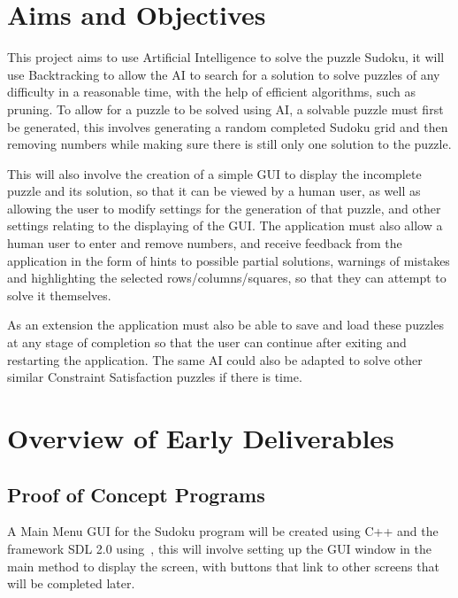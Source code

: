 \documentclass[]{final_report}
\begin{document}
\section*{Aims and Objectives}

This project aims to use Artificial Intelligence to solve the puzzle Sudoku, it will use Backtracking to allow the AI to search for a solution to solve puzzles of any difficulty in a reasonable time, with the help of efficient algorithms, such as pruning. To allow for a puzzle to be solved using AI, a solvable puzzle must first be generated, this involves generating a random completed Sudoku grid and then removing numbers while making sure there is still only one solution to the puzzle.

This will also involve the creation of a simple GUI to display the incomplete puzzle and its solution, so that it can be viewed by a human user, as well as allowing the user to modify settings for the generation of that puzzle, and other settings relating to the displaying of the GUI. The application must also allow a human user to enter and remove numbers, and receive feedback from the application in the form of hints to possible partial solutions, warnings of mistakes and highlighting the selected rows/columns/squares, so that they can attempt to solve it themselves.

As an extension the application must also be able to save and load these puzzles at any stage of completion so that the user can continue after exiting and restarting the application. The same AI could also be adapted to solve other similar Constraint Satisfaction puzzles if there is time.

\newpage
\section*{Overview of Early Deliverables}

\subsection*{Proof of Concept Programs}

A Main Menu GUI for the Sudoku program will be created using C++ and the framework SDL 2.0 using~\cite{MITCHELL:2013}, this will involve setting up the GUI window in the main method to display the screen, with buttons that link to other screens that will be completed later.
\end{document}

